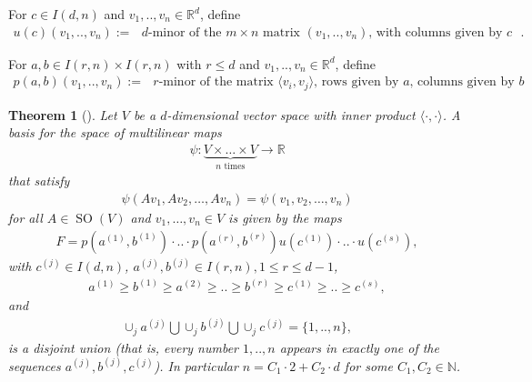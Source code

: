 \documentclass{scrartcl}
\newtheorem{theorem}{Theorem}
\theoremstyle{plain}
\theoremstyle{definition}
\newcommand{\R}{\mathbb{R}}
\newcommand{\N}{\mathbb{N}}
\newcommand{\1}[1]{1_{\{#1\}}}
\newcommand{\ds}{d} %
\begin{document}
For $c \in I(\ds,n)$ and $v_1, .., v_n \in \R^\ds$, define %
\begin{align*}
  u(c)( v_1,..,v_n ) := \text{ $\ds$-minor of the $m \times n$ matrix $(v_1,..,v_n)$, with columns given by $c$ }.
\end{align*}

For $a,b \in I(r,n) \times I(r,n)$ with $r \le \ds$ and $v_1,..,v_n \in \R^\ds$, define
\begin{align*}
  p(a,b)( v_1,..,v_n ) := \text{ $r$-minor of the matrix $\langle v_i, v_j \rangle$, rows given by $a$, columns given by $b$ } 
\end{align*}

\begin{theorem}[{\cite[Theorem 12.5.0.8]{bib:LK2007}}] 
  Let $V$ be a $\ds$-dimensional vector space with inner product $\langle \cdot, \cdot \rangle$.
  A basis for the space of multilinear maps
  \begin{align*}
    \psi: \underbrace{V \times \dots \times V}_{n \text{ times}} \to \R
  \end{align*}
  that satisfy
  \begin{align*}
    \psi(A v_1, A v_2, \dots, A v_n) = \psi(v_1, v_2, \dots, v_n)
  \end{align*}
  for all $A \in \operatorname{SO}(V)$ and $v_1, \dots, v_n \in V$ 
  is given by the maps
  \begin{align*}
    F = p\left(a^{(1)},b^{(1)}\right) \cdot .. \cdot p\left(a^{(r)},b^{(r)}\right) u\left(c^{(1)}\right) \cdot .. \cdot u\left(c^{(s)}\right),
  \end{align*}
  with $c^{(j)} \in I(\ds,n)$,
  $a^{(j)},b^{(j)} \in I(r,n), 1 \le r \le \ds-1$,
  \begin{align*}
    a^{(1)} \ge b^{(1)} \ge a^{(2)} \ge .. \ge b^{(r)} \ge c^{(1)} \ge .. \ge c^{(s)},
  \end{align*}
  and
  \begin{align*}
    \cup_j a^{(j)} \bigcup \cup_j b^{(j)} \bigcup \cup_j c^{(j)} = \{1, .., n\},
  \end{align*}
  is a \emph{disjoint} union (that is, every number $1,..,n$ appears in exactly one of the sequences $a^{(j)},b^{(j)},c^{(j)}$).
  In particular $n = C_1 \cdot 2 + C_2 \cdot \ds$ for some $C_1,C_2 \in \N$.
\end{theorem}
\end{document}
